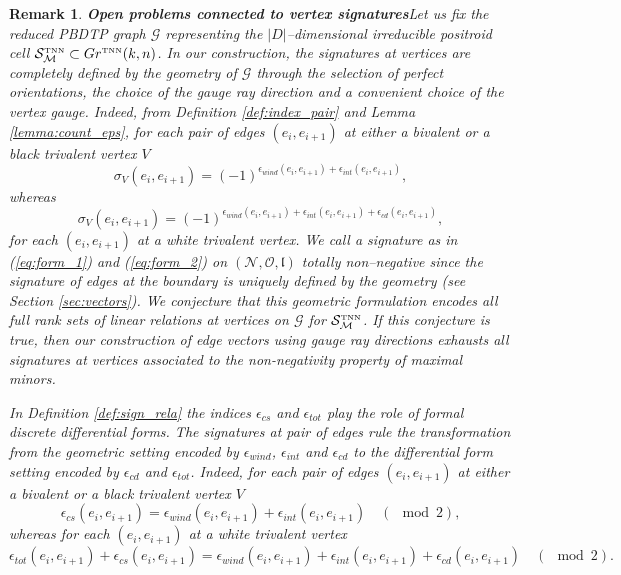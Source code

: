 \documentclass[11pt]{amsart}
\theoremstyle{plain}
\numberwithin{equation}{section}
\newtheorem{remark}{Remark}[subsection]
\def \GTNN {{Gr^{\mbox{\tiny TNN}} (k,n)}}
\def \S {{\mathcal S}_{\mathcal M}^{\mbox{\tiny TNN}}}
\begin{document}
\begin{remark}\textbf{Open problems connected to vertex signatures}\label{conj:sign}
Let us fix the reduced PBDTP graph $\mathcal G$ representing the $|D|$--dimensional irreducible positroid cell $\S \subset \GTNN$.
In our construction, the signatures at vertices are completely defined by the geometry of $\mathcal G$ through the selection of perfect orientations, the choice of the gauge ray direction and a convenient choice of the vertex gauge.
Indeed, from Definition \ref{def:index_pair} and Lemma \ref{lemma:count_eps}, for each pair of edges $(e_i, e_{i+1})$ at either a bivalent or a black trivalent vertex $V$
\begin{equation}\label{eq:form_1}
\sigma_V (e_i, e_{i+1})= (-1)^{\epsilon_{wind} (e_i,e_{i+1})+\epsilon_{int} (e_i,e_{i+1}) },
\end{equation}
whereas
\begin{equation}\label{eq:form_2}
\sigma_V (e_i, e_{i+1})= (-1)^{ \epsilon_{wind} (e_i,e_{i+1})+\epsilon_{int} (e_i,e_{i+1}) +\epsilon_{cd} (e_i,e_{i+1})},
\end{equation}
for each $(e_i, e_{i+1})$ at a white trivalent vertex. 
We call a signature as in (\ref{eq:form_1}) and (\ref{eq:form_2}) on $(\mathcal N, \mathcal O, \mathfrak l)$ totally non--negative since the signature of edges at the boundary is uniquely defined by the geometry (see Section \ref{sec:vectors}).
We conjecture that this geometric formulation encodes all full rank sets of linear relations at vertices on $\mathcal G$ for $\S$.
If this conjecture is true, then our construction of edge vectors using gauge ray directions exhausts all signatures at vertices associated to the non-negativity property of maximal minors.

In Definition \ref{def:sign_rela} the indices $\epsilon_{cs}$ and $\epsilon_{tot}$ play the role of formal discrete differential forms. The signatures at pair of edges rule the transformation from the geometric setting encoded by $\epsilon_{wind}$, $\epsilon_{int}$ and $\epsilon_{cd}$ to the differential form setting encoded by $\epsilon_{cd}$ and $\epsilon_{tot}$.
Indeed, for each pair of edges $(e_i, e_{i+1})$ at either a bivalent or a black trivalent vertex $V$
\begin{equation}\label{eq:form_3}
\epsilon_{cs} (e_i,e_{i+1}) = \epsilon_{wind} (e_i,e_{i+1})+\epsilon_{int} (e_i,e_{i+1}) \quad (\!\!\!\!\!\!\mod 2),
\end{equation}
whereas for each $(e_i, e_{i+1})$ at a white trivalent vertex
\begin{equation}\label{eq:form_4}
\epsilon_{tot} (e_i,e_{i+1}) +\epsilon_{cs} (e_i,e_{i+1}) = \epsilon_{wind} (e_i,e_{i+1})+\epsilon_{int} (e_i,e_{i+1}) +\epsilon_{cd} (e_i,e_{i+1})\quad (\!\!\!\!\!\!\mod 2).
\end{equation}


\end{remark}
\end{document}

